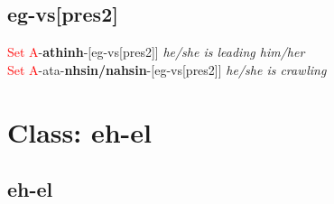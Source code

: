 \documentclass[oneside,openany]{book}%
\begin{document}
\subsection*{eg-vs[pres2]}%
\textcolor{Red}{Set A}{-}\textbf{athinh}{-}[eg-vs[pres2]] \textit{ he/she is leading him/her} \\%
\textcolor{Red}{Set A}{-}ata{-}\textbf{nhsin/nahsin}{-}[eg-vs[pres2]] \textit{ he/she is crawling} \\%
\vspace{1em}%
\needspace{3in}%
\section*{Class: eh-el}%
%
\needspace{1in}%
\subsection*{eh-el}%
\end{document}
